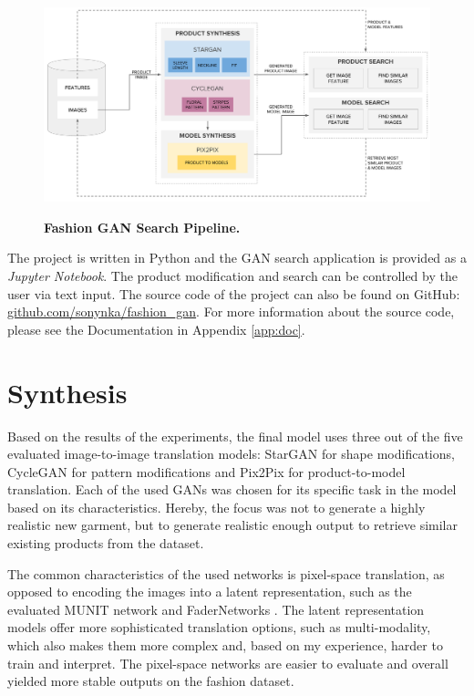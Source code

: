 \documentclass[12pt]{report}
\begin{document}
\vspace{0.5cm}
\begin{figure}[h]
\centering
{\includegraphics[width=\linewidth]{05_results/pipeline}}
\caption{\label{fig:pipeline} \textbf{Fashion GAN Search Pipeline.}}
\end{figure}

The project is written in Python and the GAN search application is provided as a \textit{Jupyter Notebook}. The product modification and search can be controlled by the user via text input. The source code of the project can also be found on GitHub: \linebreak \hyperlink{https://github.com/sonynka/fashion\_gan}{github.com/sonynka/fashion\_gan}. For more information about the source code, please see the Documentation in Appendix \ref{app:doc}.

\section{Synthesis}
Based on the results of the experiments, the final model uses three out of the five evaluated image-to-image translation models: StarGAN \cite{choi_stargan_2017} for shape modifications, CycleGAN \cite{zhu_unpaired_2017} for pattern modifications and Pix2Pix \cite{isola_image--image_2016} for product-to-model translation. Each of the used GANs was chosen for its specific task in the model based on its characteristics. Hereby, the focus was not to generate a highly realistic new garment, but to generate realistic enough output to retrieve similar existing products from the dataset.

The common characteristics of the used networks is pixel-space translation, as opposed to encoding the images into a latent representation, such as the evaluated MUNIT network \cite{huang_multimodal_2018} and FaderNetworks \cite{lample_fader_2017}. The latent representation models offer more sophisticated translation options, such as multi-modality, which also makes them more complex and, based on my experience, harder to train and interpret. The pixel-space networks are easier to evaluate and overall yielded more stable outputs on the fashion dataset.
\end{document}
